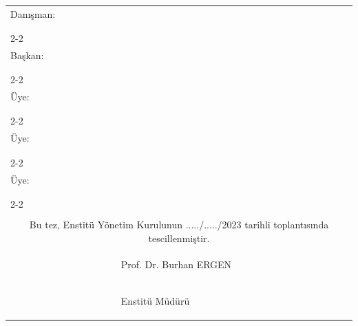 \begin{titlepage}
\begin{table}[ht!]
\begin{tabular}{ p{} p{}}
\raggedleft \footnotesize Danışman:		& \small \danisman\\[-35pt]
				&	{\begin{flushright}
					{\footnotesize \danismankarar}
					\end{flushright}}\\[-15pt]
				& {\footnotesize \danismankurum}\\
\cline{2-2}
&\\
%
\raggedleft \footnotesize Başkan:		& {\small \baskan}\\[-35pt]
				&	{\begin{flushright}
					{\footnotesize \baskankarar}
					\end{flushright}}\\[-15pt]
				& {\footnotesize \baskankurum}\\
\cline{2-2}
&\\
%
\raggedleft \footnotesize Üye:		& {\small \uyebir}\\[-35pt]
				&	{\begin{flushright}
					{\footnotesize \uyebirkarar}
					\end{flushright}}\\[-15pt]
				& {\footnotesize \uyebirkurum}\\
\cline{2-2}
&\\
%
\raggedleft \footnotesize Üye:		& {\small \uyeiki}\\[-35pt]
				&	{\begin{flushright}
					{\footnotesize\uyeikikarar}
					\end{flushright}}\\[-15pt]
				& {\footnotesize \uyeikikurum}\\
\cline{2-2}
&\\
%
\raggedleft \footnotesize Üye:		& {\small \uyeuc}\\[-35pt]
				&	{\begin{flushright}
					{\footnotesize \uyeuckarar}
					\end{flushright}}\\[-15pt]
				& {\footnotesize \uyeuckurum}\\
\cline{2-2}
&\\
%
&\\[10pt]
				 \multicolumn{2}{c}{\hspace{2.5cm}\footnotesize Bu tez, Enstitü Yönetim Kurulunun ...../...../2023 tarihli toplantısında tescillenmiştir.}\\		
				& {\begin{center}
						\hspace{-1cm}\small Prof. Dr. Burhan ERGEN
				\end{center}}			\\[-35pt]					            
				& {\begin{center}
						\hspace{-1cm}\small Enstitü Müdürü
				\end{center}}				\\[-35pt]
							

\end{tabular}
\end{table}
\end{titlepage}
